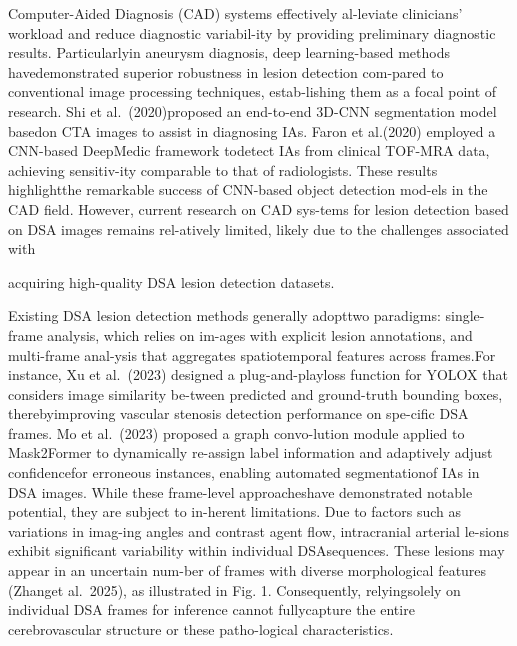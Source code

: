 \documentclass[
  10
]{article}
\begin{document}
Computer-Aided Diagnosis (CAD) systems effectively al-leviate
clinicians' workload and reduce diagnostic variabil-ity by providing
preliminary diagnostic results. Particularlyin aneurysm diagnosis, deep
learning-based methods havedemonstrated superior robustness in lesion
detection com-pared to conventional image processing techniques,
estab-lishing them as a focal point of research. Shi et
al.~(2020)proposed an end-to-end 3D-CNN segmentation model basedon CTA
images to assist in diagnosing IAs. Faron et al.(2020) employed a
CNN-based DeepMedic framework todetect IAs from clinical TOF-MRA data,
achieving sensitiv-ity comparable to that of radiologists. These results
highlightthe remarkable success of CNN-based object detection mod-els in
the CAD field. However, current research on CAD sys-tems for lesion
detection based on DSA images remains rel-atively limited, likely due to
the challenges associated with

acquiring high-quality DSA lesion detection datasets.

Existing DSA lesion detection methods generally adopttwo paradigms:
single-frame analysis, which relies on im-ages with explicit lesion
annotations, and multi-frame anal-ysis that aggregates spatiotemporal
features across frames.For instance, Xu et al.~(2023) designed a
plug-and-playloss function for YOLOX that considers image similarity
be-tween predicted and ground-truth bounding boxes, therebyimproving
vascular stenosis detection performance on spe-cific DSA frames. Mo et
al.~(2023) proposed a graph convo-lution module applied to Mask2Former
to dynamically re-assign label information and adaptively adjust
confidencefor erroneous instances, enabling automated segmentationof IAs
in DSA images. While these frame-level approacheshave demonstrated
notable potential, they are subject to in-herent limitations. Due to
factors such as variations in imag-ing angles and contrast agent flow,
intracranial arterial le-sions exhibit significant variability within
individual DSAsequences. These lesions may appear in an uncertain
num-ber of frames with diverse morphological features (Zhanget
al.~2025), as illustrated in Fig. 1. Consequently, relyingsolely on
individual DSA frames for inference cannot fullycapture the entire
cerebrovascular structure or these patho-logical characteristics.
\end{document}
